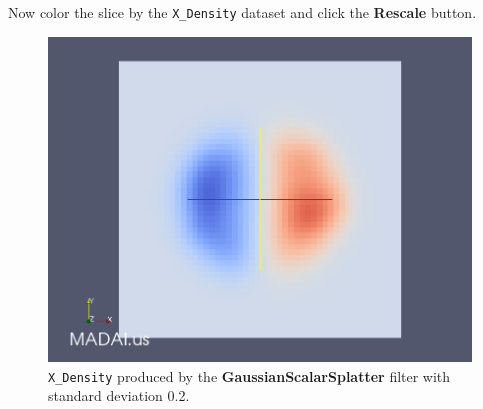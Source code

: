 \documentclass[12pt]{article}
\begin{document}
Now color the slice by the \texttt{X\_Density} dataset and click the \textbf{Rescale} button.

\begin{figure}[htbp]
   \centering
   \includegraphics[scale=.25]{images/GaussianScalarSplatterXDensity.png} %
   \caption{\texttt{X\_Density} produced by the \textbf{GaussianScalarSplatter} filter with standard deviation 0.2.}
   \label{fig:GaussianScalarSplatter2}
\end{figure}




\end{document}

